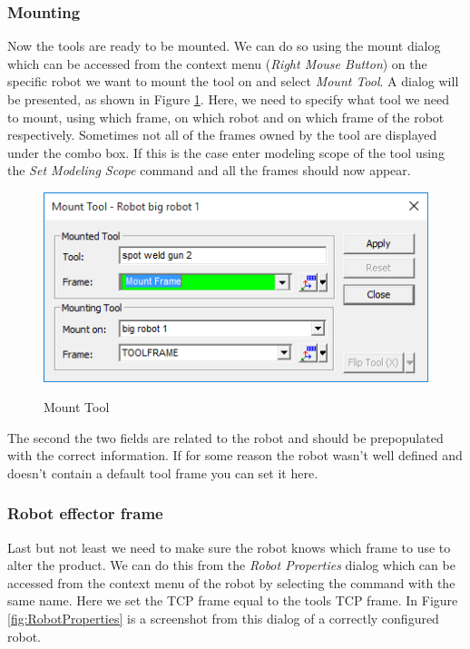 \subsubsection{Mounting}
Now the tools are ready to be mounted.
We can do so using the mount dialog which can be accessed from the context menu (\emph{Right Mouse Button}) on the specific robot we want to mount the tool on and select \emph{Mount Tool}.
A dialog will be presented, as shown in Figure \ref{fig:MountTool}.
Here, we need to specify what tool we need to mount, using which frame, on which robot and on which frame of the robot respectively.
Sometimes not all of the frames owned by the tool are displayed under the combo box. 
If this is the case enter modeling scope of the tool using the \emph{Set Modeling Scope} command and all the frames should now appear. \\

\begin{figure}[H]
    \caption{Mount Tool}
    \centering
    \includegraphics{mount_tool}
    \label{fig:MountTool}
\end{figure}

The second the two fields are related to the robot and should be prepopulated with the correct information.
If for some reason the robot wasn't well defined and doesn't contain a default tool frame you can set it here. \\

\subsubsection{Robot effector frame}
Last but not least we need to make sure the robot knows which frame to use to alter the product.
We can do this from the \emph{Robot Properties} dialog which can be accessed from the context menu of the robot by selecting the command with the same name. 
Here we set the TCP frame equal to the tools TCP frame.
In Figure \ref{fig:RobotProperties} is a screenshot from this dialog of a correctly configured robot. \\

